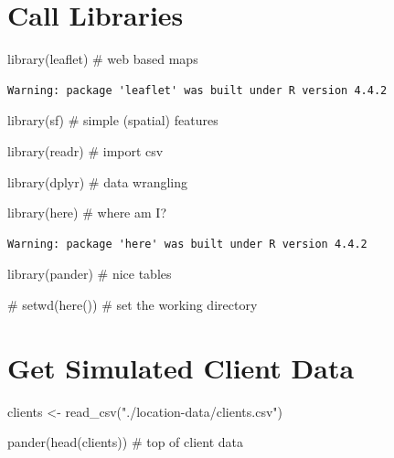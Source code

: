 \documentclass[
  letterpaper,
  DIV=11,
  numbers=noendperiod,
  oneside]{scrreprt}
\newenvironment{Shaded}{\begin{snugshade}}{\end{snugshade}}
\newcommand{\CommentTok}[1]{\textcolor[rgb]{0.37,0.37,0.37}{#1}}
\newcommand{\FunctionTok}[1]{\textcolor[rgb]{0.28,0.35,0.67}{#1}}
\newcommand{\NormalTok}[1]{\textcolor[rgb]{0.00,0.23,0.31}{#1}}
\newcommand{\OtherTok}[1]{\textcolor[rgb]{0.00,0.23,0.31}{#1}}
\newcommand{\StringTok}[1]{\textcolor[rgb]{0.13,0.47,0.30}{#1}}
\begin{document}
\section{Call Libraries}\label{call-libraries-8}

\begin{Shaded}
\begin{Highlighting}[]
\FunctionTok{library}\NormalTok{(leaflet) }\CommentTok{\# web based maps}
\end{Highlighting}
\end{Shaded}

\begin{verbatim}
Warning: package 'leaflet' was built under R version 4.4.2
\end{verbatim}

\begin{Shaded}
\begin{Highlighting}[]
\FunctionTok{library}\NormalTok{(sf) }\CommentTok{\# simple (spatial) features}

\FunctionTok{library}\NormalTok{(readr) }\CommentTok{\# import csv}

\FunctionTok{library}\NormalTok{(dplyr) }\CommentTok{\# data wrangling}

\FunctionTok{library}\NormalTok{(here) }\CommentTok{\# where am I?}
\end{Highlighting}
\end{Shaded}

\begin{verbatim}
Warning: package 'here' was built under R version 4.4.2
\end{verbatim}

\begin{Shaded}
\begin{Highlighting}[]
\FunctionTok{library}\NormalTok{(pander) }\CommentTok{\# nice tables}

\CommentTok{\# setwd(here()) \# set the working directory}
\end{Highlighting}
\end{Shaded}

\section{Get Simulated Client Data}\label{get-simulated-client-data}

\begin{Shaded}
\begin{Highlighting}[]
\NormalTok{clients }\OtherTok{\textless{}{-}} \FunctionTok{read\_csv}\NormalTok{(}\StringTok{"./location{-}data/clients.csv"}\NormalTok{)}

\FunctionTok{pander}\NormalTok{(}\FunctionTok{head}\NormalTok{(clients)) }\CommentTok{\# top of client data}
\end{Highlighting}
\end{Shaded}
\end{document}
